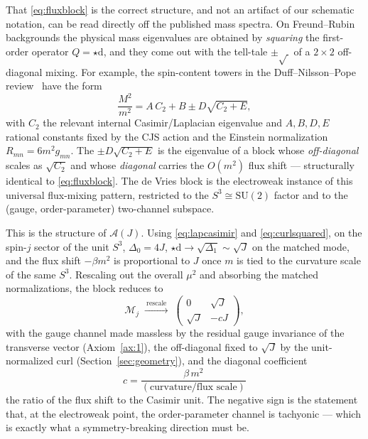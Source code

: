 \documentclass[11pt]{article}
\theoremstyle{plain}
\theoremstyle{definition}
\newcommand{\cA}{\mathcal{A}}
\newcommand{\cM}{\mathcal{M}}
\newcommand{\dd}{\mathrm{d}}
\newcommand{\SU}{\mathrm{SU}}
\begin{document}
That \eqref{eq:fluxblock} is the correct structure, and not an artifact of
our schematic notation, can be read directly off the published mass spectra.
On Freund--Rubin backgrounds the physical mass eigenvalues are obtained by
\emph{squaring} the first-order operator $Q=\star\dd$, and they come out with
the tell-tale $\pm\sqrt{\,}$ of a $2\times2$ off-diagonal mixing. For
example, the spin-content towers in the Duff--Nilsson--Pope
review~\cite{DuffNilssonPope1986} have the form
\begin{equation}
\frac{M^2}{m^2}=A\,C_2+B\pm D\sqrt{C_2+E},
\label{eq:dnptower}
\end{equation}
with $C_2$ the relevant internal Casimir/Laplacian eigenvalue and $A,B,D,E$
rational constants fixed by the CJS action and the Einstein normalization
$R_{mn}=6m^2g_{mn}$. The $\pm D\sqrt{C_2+E}$ is the eigenvalue of a
block whose \emph{off-diagonal} scales as $\sqrt{C_2}$ and whose
\emph{diagonal} carries the $O(m^2)$ flux shift --- structurally identical to
\eqref{eq:fluxblock}. The de Vries block is the electroweak instance of this
universal flux-mixing pattern, restricted to the $S^3\cong\SU(2)$ factor and
to the (gauge, order-parameter) two-channel subspace.

This is the structure of $\cA(J)$. Using \eqref{eq:lapcasimir} and
\eqref{eq:curlsquared}, on the spin-$j$ sector of the unit $S^3$,
$\Delta_0=4J$, $\star\dd\to\sqrt{\Delta_1}\sim\sqrt J$ on the matched mode,
and the flux shift $-\beta m^2$ is proportional to $J$ once $m$ is tied to
the curvature scale of the same $S^3$. Rescaling out the overall $\mu^2$
and absorbing the matched normalizations, the block reduces to
\begin{equation}
\cM_j\;\xrightarrow{\ \text{rescale}\ }\;
\begin{pmatrix}0&\sqrt J\\ \sqrt J&-cJ\end{pmatrix},
\end{equation}
with the gauge channel made massless by the residual gauge invariance of
the transverse vector (Axiom~\ref{ax:1}), the off-diagonal fixed to
$\sqrt J$ by the unit-normalized curl (Section~\ref{sec:geometry}), and the
diagonal coefficient
\begin{equation}
c=\frac{\beta\,m^2}{(\text{curvature/flux scale})}
\label{eq:cphys}
\end{equation}
the ratio of the flux shift to the Casimir unit. The negative sign is the
statement that, at the electroweak point, the order-parameter channel is
tachyonic --- which is exactly what a symmetry-breaking direction must be.
\end{document}
